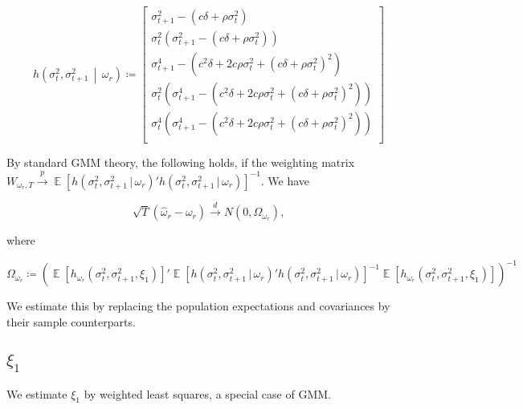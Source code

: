 \documentclass[11pt, letterpaper, twoside, final]{article}
\newcommand*{\dto}{\overset{d}{\longrightarrow}}
\newcommand*{\pto}{\overset{p}{\longrightarrow}}
\newcommand*{\mvert}{\,\middle\vert\,}
\newcommand*{\ivert}{\,\vert\,}
\DeclareMathOperator*{\E}{\mathbb{E}}
\begin{document}
\begin{equation}
    h\left(\sigma^2_{t},\sigma^2_{t+1} \mvert \omega_r\right) \coloneqq 
\begin{bmatrix}
    \sigma^2_{t+1} - (c \delta + \rho \sigma^2_{t}) \\
%
    \sigma^2_{t} \left(\sigma^2_{t+1} - (c \delta + \rho \sigma^2_{t})\right)\\
%
    \sigma^4_{t+1} - \left(c^{2} \delta + 2 c \rho \sigma^2_{t} + \left(c \delta + \rho
    \sigma^2_{t}\right)^{2}\right)\\
%
    \sigma^2_{t} \left(\sigma^4_{t+1} - \left(c^{2} \delta + 2 c \rho \sigma^2_{t} + \left(c \delta + \rho
    \sigma^2_{t}\right)^{2}\right)\right)\\

    \sigma^4_{t} \left(\sigma^4_{t+1} - \left(c^{2} \delta + 2 c \rho \sigma^2_{t} + \left(c \delta + \rho
    \sigma^2_{t}\right)^{2}\right)\right)\\
\end{bmatrix}
\end{equation}

By standard GMM theory, the following holds, if the weighting matrix \newline $W_{\omega_r,T} \pto \E[h(\sigma^2_t,
\sigma^2_{t+1} \ivert \omega_r)' h(\sigma^2_t, \sigma^2_{t+1} \ivert \omega_r)]^{-1}$.
We have 

\begin{equation}
    \sqrt{T}(\widehat{\omega}_r - \omega_r) \dto N\left(0, \Omega_{\omega_r}\right),
\end{equation}

\noindent where

\begin{equation}
    \Omega_{\omega_r} \coloneqq \left(\E\left[h_{\omega_r}(\sigma^2_{t}, \sigma^2_{t+1}, \xi_{1})\right]'
    \E[h(\sigma^2_t, \sigma^2_{t+1} \ivert \omega_r)' h(\sigma^2_t, \sigma^2_{t+1} \ivert \omega_r)]^{-1}
    \E\left[h_{\omega_r}(\sigma^2_{t}, \sigma^2_{t+1}, \xi_{1})\right]\right)^{-1}
\end{equation}

\noindent We estimate this by replacing the population expectations and covariances by their sample counterparts.

\subsection{$\xi_1$}\label{sec:est_xi2}

We estimate $\xi_1$ by weighted least squares, a special case of GMM. 
\end{document}
